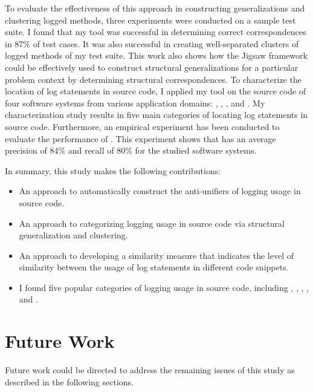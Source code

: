 To evaluate the effectiveness of this approach in constructing generalizations and clustering logged methods, three experiments were conducted on a sample test suite. I found that my tool was successful in determining correct correspondences in 87\% of test cases. It was also successful in creating well-separated clusters of logged methods of my test suite. This work also shows how the Jigsaw framework could be effectively used to construct structural generalizations for a particular problem context by determining structural correspondences. To characterize the location of log statements in source code, I applied my tool on the source code of four software systems from various application domains: , , , and . My characterization study results in five main categories of locating log statements in source code. Furthermore, an empirical experiment has been conducted to evaluate the performance of . This experiment shows that  has an average precision of 84\% and recall of 80\% for the studied software systems.  

In summary, this study makes the following contributions:
\begin{itemize} [leftmargin=.5in]
\item An approach to automatically construct the anti-unifiers of logging usage in source code.
\item An approach to categorizing logging usage in source code via structural generalization and clustering.
\item An approach to developing a similarity measure that indicates the level of similarity between the usage of log statements in different code snippets.
\item I found five popular categories of logging usage in source code, including , , , , and . 

\end{itemize}


\section{Future Work}  \label{fw}
Future work could be directed to address the remaining issues of this study as described in the following sections.


